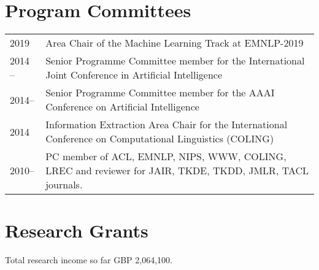 \documentclass[a4paper,11pt]{article}
\begin{document}
\section{Program Committees}
\begin{tabular}{l p{13cm}}
2019 & Area Chair of the Machine Learning Track at EMNLP-2019\\
2014 -- & Senior Programme Committee member for the International Joint Conference in Artificial Intelligence\\
2014-- & Senior Programme Committee member for the AAAI Conference on Artificial Intelligence\\
2014 & Information Extraction Area Chair for the International Conference on Computational Linguistics (COLING)\\
2010-- & PC member of ACL, EMNLP, NIPS, WWW, COLING, LREC and reviewer for JAIR, TKDE, TKDD, JMLR, TACL journals.
\end{tabular}



\section{Research Grants}

Total research income so far GBP 2,064,100.
\end{document}
